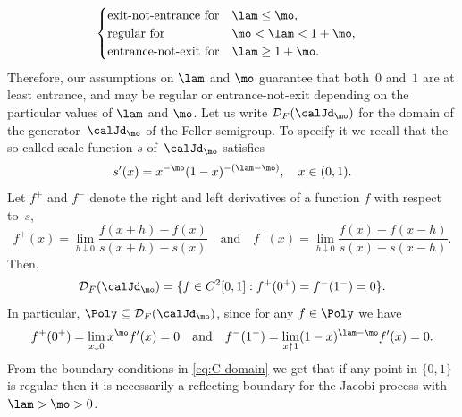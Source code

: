 \begin{appendix}
\begin{align*}
&\begin{cases}
\text{exit-not-entrance for} & \lam \leq \mo,\\
\text{regular for} & \mo< \lam < 1+\mo,\\
\text{entrance-not-exit for} & \lam \geq 1+\mo.
\end{cases}
\end{align*}
Therefore, our assumptions  on $\lam$ and $\mo$ guarantee that both~$0$ and~$1$ are at least entrance, and may be regular or entrance-not-exit depending on the particular values of $\lam$ and $\mo$. Let us write $\mathcal{D}_F(\calJd_\mo)$ for the domain of the generator~$\calJd_\mo$ of the Feller semigroup. To specify it we recall that the so-called scale function $s$ of~$\calJd_\mo$ satisfies
\begin{equation*}
s'(x)= x^{-\mo}(1-x)^{-(\lam-\mo)}, \quad x \in (0,1).
\end{equation*}
Let $f^+$ and $f^-$ denote the right and left derivatives of a function $f$ with respect to~$s$, \ie\vspace*{-3pt}
\begin{equation*}
f^+(x) =\lim_{h \downarrow 0}\frac{f(x+h)-f(x)}{s(x+h)-s(x)} \quad \text{and} \quad f^-(x) =\lim_{h \downarrow 0}\frac{f(x)-f(x-h)}{s(x)-s(x-h)}.
\end{equation*}
Then,\vspace*{-3pt}
\begin{equation}
\label{eq:C-domain}
\mathcal{D}_{F}(\calJd_\mo) =\lbrace f \in C^2[0,1] : f^+(0^+) = f^-(1^-) = 0\rbrace.
\end{equation}
In particular, $\Poly \subseteq \mathcal{D}_{F}(\calJd_\mo)$, since for any $f \in \Poly$ we have\vspace*{-3pt}
\begin{equation*}
f^+(0^+) = \lim_{x \downarrow 0} x^{\mo} f'(x) = 0 \quad \text{and} \quad f^-(1^-) = \lim_{x \uparrow 1} (1-x)^{\lam-\mo} f'(x) = 0.
\end{equation*}
From the boundary conditions in \eqref{eq:C-domain} we get that if any point in $\{0,1\}$ is regular then it is necessarily a reflecting boundary for the Jacobi process with $\lam > \mo > 0$.

 \label{subsec:inv-measure}


\end{appendix}
